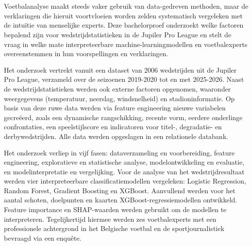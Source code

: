 
\chapter*{}

Voetbalanalyse maakt steeds vaker gebruik van data-gedreven methoden,
maar de verklaringen die hieruit voortvloeien worden zelden systematisch vergeleken met de intuïtie van menselijke experts.
Deze bachelorproef onderzoekt welke factoren bepalend zijn voor wedstrijdstatistieken in de Jupiler Pro League
en stelt de vraag in welke mate interpreteerbare machine-learningmodellen en voetbalexperts overeenstemmen
in hun voorspellingen en verklaringen.

\vspace{5pt}

Het onderzoek vertrekt vanuit een dataset van 2006 wedstrijden uit de Jupiler Pro League, verzameld over de seizoenen 2019-2020
tot en met 2025-2026. Naast de wedstrijdstatistieken werden ook externe factoren opgenomen,
waaronder weergegevens (temperatuur, neerslag, windsnelheid) en stadioninformatie.
Op basis van deze ruwe data werden via feature engineering nieuwe variabelen gecreëerd, 
zoals een dynamische rangschikking, recente vorm, eerdere onderlinge confrontaties, 
een speelstijlscore en indicatoren voor titel-, degradatie- en derbywedstrijden. 
Alle data werden opgeslagen in een relationele databank.

\vspace{5pt}

Het onderzoek verliep in vijf fasen: dataverzameling en voorbereiding, feature engineering,
exploratieve en statistische analyse, modelontwikkeling en evaluatie, en modelinterpretatie en vergelijking.
Voor de analyse van het wedstrijdresultaat werden vier interpreteerbare classificatiemodellen vergeleken:
Logistic Regression, Random Forest, Gradient Boosting en XGBoost.
Aanvullend werden voor het aantal schoten, doelpunten en kaarten XGBoost-regressiemodellen ontwikkeld.
Feature importance en SHAP-waarden werden gebruikt om de modellen te interpreteren.
Tegelijkertijd hiermee werden zes voetbalexperts met een professionele achtergrond in het Belgische voetbal en de sportjournalistiek bevraagd via een enquête.

\vspace{5pt}

